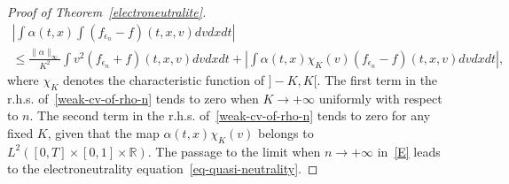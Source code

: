 \documentclass[AHL,Unicode,longabstracts,published]{cedram}
\newcommand{\R}{\mathbb{R}}
\begin{document}
\begin{proof}[{Proof of Theorem~\ref{electroneutralite}}]
\begin{multline}
\left |\int \alpha(t,x) \int \left(f_{\epsilon _n}-f\right)(t,x,v) dvdxdt \right|\\
\leq \frac{\|\alpha\|_{\infty}}{K^2} \int v^2\left(f_{\epsilon _n}+f\right)(t,x,v) dvdxdt + \left| \int \alpha(t,x) \chi_K(v)\left(f_{\epsilon _n}-f\right)(t,x,v) dvdxdt \right|,
\end{multline}
where $\chi_K$ denotes the characteristic function of $]-K,K[$. The first term in the r.h.s. of~\eqref{weak-cv-of-rho-n} tends to zero when $K \to +\infty $ uniformly with respect to $n$. The second term in the r.h.s. of~\eqref{weak-cv-of-rho-n} tends to zero for any fixed $K$, given that the map $\alpha(t,x) \chi_K(v)$ belongs to $L^2([0,T] \times [0,1] \times \R)$. The passage to the limit when $n \to +\infty $ in~\eqref{E} leads to the electroneutrality equation~\eqref{eq-quasi-neutrality}.
\end{proof}
\vspace{30pt}


\end{document}
